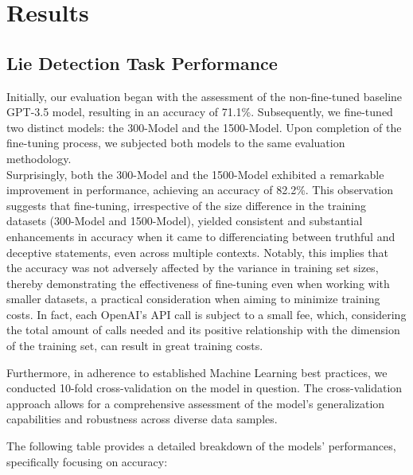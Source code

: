 \documentclass[10pt,twocolumn,letterpaper]{article}
\begin{document}
\section{Results}

\subsection{Lie Detection Task Performance}

Initially, our evaluation began with the assessment of the non-fine-tuned
baseline GPT-3.5 model, resulting in an accuracy of 71.1\%. Subsequently,
we fine-tuned two distinct models: the 300-Model and the 1500-Model. 
Upon completion of the fine-tuning process, we subjected both models 
to the same evaluation methodology. \\

Surprisingly, both the 300-Model and the 1500-Model exhibited a 
remarkable improvement in performance, achieving an accuracy of 82.2\%. 
This observation suggests that fine-tuning, irrespective of the size 
difference in the training datasets (300-Model and 1500-Model), yielded 
consistent and substantial enhancements in accuracy when it came to differenciating
between truthful and deceptive statements, even across multiple contexts. 
Notably, this implies that the accuracy was not adversely affected 
by the variance in training set sizes, thereby demonstrating the 
effectiveness of fine-tuning even when working with smaller datasets, 
a practical consideration when aiming to minimize training costs. In fact, each OpenAI's API call
is subject to a small fee, which, considering the total amount of calls needed and its positive relationship
with the dimension of the training set, can result in great training costs.

Furthermore, in adherence to established Machine Learning best practices,
we conducted 10-fold cross-validation on the model in question. 
The cross-validation approach allows for a comprehensive assessment 
of the model's generalization capabilities and robustness across 
diverse data samples.

The following table provides a detailed breakdown of the models' performances,
specifically focusing on accuracy:
\end{document}
